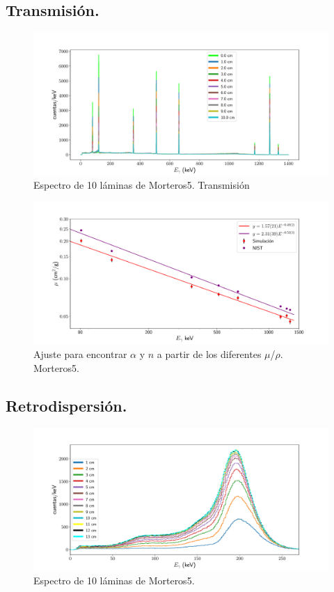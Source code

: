  
 \subsection{Transmisión.}
 
\begin{figure}[H]
	\centering
	\includegraphics[width=1.0\linewidth]{Kap4/espectro_m5-10Mtrans.pdf}
	\caption{Espectro de 10 láminas de Morteros5. Transmisión}
	\label{fig:espectrom5-10mtrans}
\end{figure}
 
\begin{figure}[H]
	\centering
	\includegraphics[width=1.0\linewidth]{Kap4/mu-trans-m5.pdf}
	\caption{Ajuste para encontrar $\alpha$ y $n$ a partir de los diferentes $\mu$/$\rho$. Morteros5.}
	\label{fig:mu-trans-m5}
\end{figure}
 
 \subsection{Retrodispersión.}
 
\begin{figure}[H]
	\centering
	\includegraphics[width=1.0\linewidth]{Kap4/espectro_m5.pdf}
	\caption{Espectro de 10 láminas de Morteros5.}
	\label{fig:espectrom5}
\end{figure}

